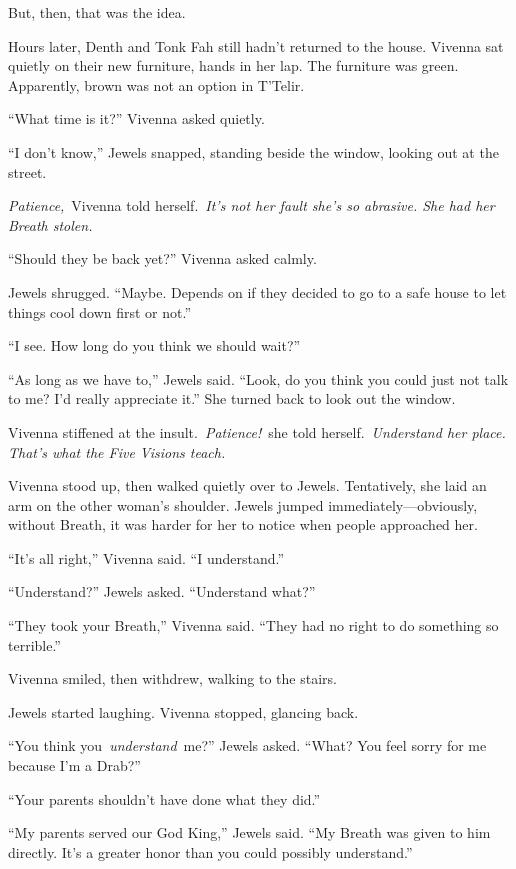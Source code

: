 But, then, that was the idea.

\orn

Hours later, Denth and Tonk Fah still hadn’t returned to the house. Vivenna sat quietly on their new furniture, hands in her lap. The furniture was green. Apparently, brown was not an option in T’Telir.

“What time is it?” Vivenna asked quietly.

“I don’t know,” Jewels snapped, standing beside the window, looking out at the street.

\textit{Patience,}~Vivenna told herself.~\textit{It’s not her fault she’s so abrasive. She had her Breath stolen.}

“Should they be back yet?” Vivenna asked calmly.

Jewels shrugged. “Maybe. Depends on if they decided to go to a safe house to let things cool down first or not.”

“I see. How long do you think we should wait?”

“As long as we have to,” Jewels said. “Look, do you think you could just not talk to me? I’d really appreciate it.” She turned back to look out the window.

Vivenna stiffened at the insult.~\textit{Patience!}~she told herself.~\textit{Understand her place. That’s what the Five Visions teach.}

Vivenna stood up, then walked quietly over to Jewels. Tentatively, she laid an arm on the other woman’s shoulder. Jewels jumped immediately—obviously, without Breath, it was harder for her to notice when people approached her.

“It’s all right,” Vivenna said. “I understand.”

“Understand?” Jewels asked. “Understand what?”

“They took your Breath,” Vivenna said. “They had no right to do something so terrible.”

Vivenna smiled, then withdrew, walking to the stairs.

Jewels started laughing. Vivenna stopped, glancing back.

“You think you~\textit{understand}~me?” Jewels asked. “What? You feel sorry for me because I’m a Drab?”

“Your parents shouldn’t have done what they did.”

“My parents served our God King,” Jewels said. “My Breath was given to him directly. It’s a greater honor than you could possibly understand.”

